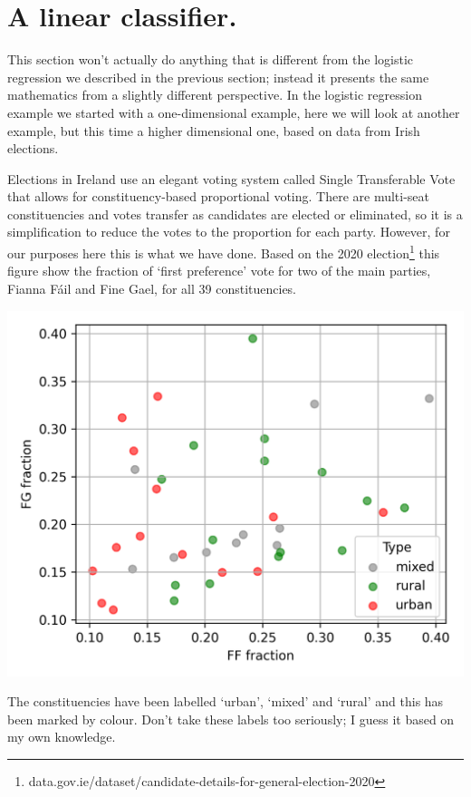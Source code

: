 \documentclass[12pt]{article}
\begin{document}
\section*{A linear classifier.} 

This section won't actually do anything that is different from the
logistic regression we described in the previous section; instead it
presents the same mathematics from a slightly different
perspective. In the logistic regression example we started with a
one-dimensional example, here we will look at another example, but
this time a higher dimensional one, based on data from Irish elections.

Elections in Ireland use an elegant voting system called Single
Transferable Vote that allows for constituency-based proportional
voting. There are multi-seat constituencies and votes transfer as
candidates are elected or eliminated, so it is a simplification to
reduce the votes to the proportion for each party. However, for our
purposes here this is what we have done. Based on the 2020
election\footnote{data.gov.ie/dataset/candidate-details-for-general-election-2020}
this figure show the fraction of `first preference' vote for two of
the main parties, Fianna F\'{a}il and Fine Gael, for all 39 constituencies.
\begin{center}
  \includegraphics[]{02.5_ffVfg.png}
\end{center}
The constituencies have been labelled `urban', `mixed' and `rural' and
this has been marked by colour. Don't take these labels too seriously;
I guess it based on my own knowledge.
\end{document}

